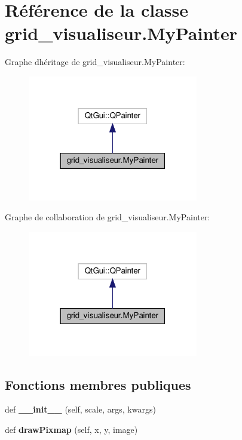 \hypertarget{classgrid__visualiseur_1_1MyPainter}{}\section{Référence de la classe grid\+\_\+visualiseur.\+My\+Painter}
\label{classgrid__visualiseur_1_1MyPainter}


Graphe d\textquotesingle{}héritage de grid\+\_\+visualiseur.\+My\+Painter\+:
\nopagebreak
\begin{figure}[H]
\begin{center}
\leavevmode
\includegraphics[width=211pt]{classgrid__visualiseur_1_1MyPainter__inherit__graph}
\end{center}
\end{figure}


Graphe de collaboration de grid\+\_\+visualiseur.\+My\+Painter\+:
\nopagebreak
\begin{figure}[H]
\begin{center}
\leavevmode
\includegraphics[width=211pt]{classgrid__visualiseur_1_1MyPainter__coll__graph}
\end{center}
\end{figure}
\subsection*{Fonctions membres publiques}
\begin{DoxyCompactItemize}
\item 
\mbox{\label{classgrid__visualiseur_1_1MyPainter_ab6f7820d87cbc1b481f2055e44559cf1}} 
def {\bfseries \+\_\+\+\_\+init\+\_\+\+\_\+} (self, scale, args, kwargs)
\item 
\mbox{\label{classgrid__visualiseur_1_1MyPainter_a0a9785ebee0d148222e2895303b053b1}} 
def {\bfseries draw\+Pixmap} (self, x, y, image)
\end{DoxyCompactItemize}
